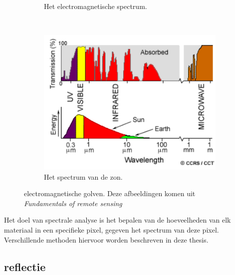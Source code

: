 \documentclass[12pt]{report}
\newcommand{\rulesep}{\unskip\ \vrule height -1ex\ }
\begin{document}
\begin{figure}
\begin{subfigure}[b]{0.2\textwidth}
\caption{Het electromagnetische spectrum. \label{fig:spec}}
\end{subfigure}\rulesep
\begin{subfigure}[b]{0.4\textwidth}
\includegraphics[width=\textwidth]{spec2.PNG}
\caption{Het spectrum van de zon. \label{fig:specs}}
\end{subfigure}
\caption{electromagnetische golven. Deze afbeeldingen komen uit \textit{Fundamentals of remote sensing\cite{fun}}}
\end{figure}


Het doel van spectrale analyse is het bepalen van de hoeveelheden van elk materiaal in een specifieke pixel, gegeven het spectrum van deze pixel. Verschillende methoden hiervoor worden beschreven in deze thesis. 

\subsection{reflectie} \label{sec:ref}

\end{document}
